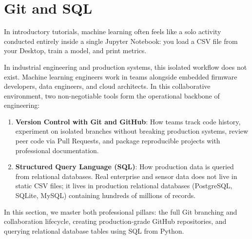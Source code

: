 \section{Git and SQL}\label{sec:git_sql}

In introductory tutorials, machine learning often feels like a solo activity conducted entirely inside a single Jupyter Notebook: you load a CSV file from your Desktop, train a model, and print metrics. 

In industrial engineering and production systems, this isolated workflow does not exist. Machine learning engineers work in teams alongside embedded firmware developers, data engineers, and cloud architects. In this collaborative environment, two non-negotiable tools form the operational backbone of engineering:
\begin{enumerate}
    \item \textbf{Version Control with Git and GitHub}: How teams track code history, experiment on isolated branches without breaking production systems, review peer code via Pull Requests, and package reproducible projects with professional documentation.
    \item \textbf{Structured Query Language (SQL)}: How production data is queried from relational databases. Real enterprise and sensor data does not live in static CSV files; it lives in production relational databases (PostgreSQL, SQLite, MySQL) containing hundreds of millions of records.
\end{enumerate}

In this section, we master both professional pillars: the full Git branching and collaboration lifecycle, creating production-grade GitHub repositories, and querying relational database tables using SQL from Python.

